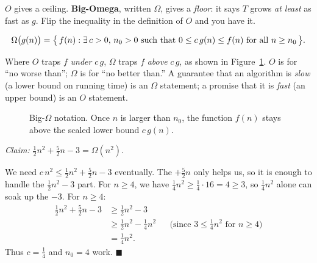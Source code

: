 $O$ gives a ceiling. \textbf{Big-Omega}, written $\Omega$, gives a \emph{floor}: it
says $T$ grows \emph{at least} as fast as $g$. Flip the inequality in the definition
of $O$ and you have it.

\begin{formalbox}
\begin{definition}\label{ch03:def-bigomega}
\[
  \Omega\bigl(g(n)\bigr) = \set[\big]{\, f(n) : \exists\, c>0,\, n_0>0
  \text{ such that } 0 \le c\,g(n) \le f(n) \text{ for all } n \ge n_0 \,}.
\]
\end{definition}
\end{formalbox}

Where $O$ traps $f$ \emph{under} $c\,g$, $\Omega$ traps $f$ \emph{above} $c\,g$, as shown in Figure~\ref{ch03:fig-bigomega}.
$O$ is for ``no worse than''; $\Omega$ is for ``no better than.'' A guarantee that an
algorithm is \emph{slow} (a lower bound on running time) is an $\Omega$ statement; a
promise that it is \emph{fast} (an upper bound) is an $O$ statement.

\begin{figure}[htbp]
\centering
{}
\caption{Big-$\Omega$ notation. Once $n$ is larger than $n_0$, the function $f(n)$ stays above the scaled lower bound $c\,g(n)$.}
\label{ch03:fig-bigomega}
\end{figure}

\begin{example}\label{ch03:ex-omega}
\emph{Claim:} $\frac12 n^2 + \frac52 n - 3 = \Omega(n^2)$.

We need $c\,n^2 \le \frac12 n^2 + \frac52 n - 3$ eventually. The $+\frac52 n$ only
helps us, so it is enough to handle the $\frac12 n^2 - 3$ part. For $n \ge 4$, we have $\frac14 n^2 \ge \frac14\cdot 16 = 4 \ge 3$,
so $\frac14 n^2$ alone can soak up the $-3$. For $n \ge 4$:
\begin{align*}
  \tfrac12 n^2 + \tfrac52 n - 3 
  &\ge \tfrac12 n^2 - 3 \\
  &\ge \tfrac12 n^2 - \tfrac14 n^2 && \text{(since $3 \le \tfrac14 n^2$ for $n \ge 4$)} \\
  &= \tfrac14 n^2 .
\end{align*}
Thus $c = \frac14$ and $n_0 = 4$ work. \hfill$\blacksquare$
\end{example}

